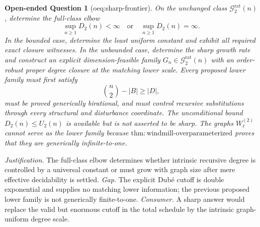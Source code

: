 \documentclass{article}
\newtheorem{openendedquestion}{Open-ended Question}
\begin{document}
\begin{openendedquestion}[oeq:sharp-frontier]\label{oeq:sharp-frontier}
On the unchanged class \(\mathcal G_{2}^{\mathrm{rat}}(n)\), determine the full-class elbow
\[
 \sup_{n\geq1}D_2(n)<\infty\quad\text{or}\quad \sup_{n\geq1}D_2(n)=\infty.
\]
In the bounded case, determine the least uniform constant and exhibit all required exact closure witnesses.  In the unbounded case, determine the sharp growth rate and construct an explicit dimension-feasible family \(G_n\in\mathcal G_{2}^{\mathrm{rat}}(n)\) with an order-robust proper degree closure at the matching lower scale.  Every proposed lower family must first satisfy
\[
 \binom n2-|B|\geq |D|,
\]
must be proved generically birational, and must control recursive substitutions through every structural and disturbance coordinate.  The unconditional bound \(D_2(n)\leq U_2(n)\) is available but is not asserted to be sharp.  The graphs \(W_{\ell}^{(2)}\) cannot serve as the lower family because \(\mathrm{thm:windmill\mbox{-}overparameterized}\) proves that they are generically infinite-to-one.
\end{openendedquestion}
\par\smallskip\noindent \textit{Justification.} The full-class elbow determines whether intrinsic recursive degree is controlled by a universal constant or must grow with graph size after mere effective decidability is settled. \textit{Gap.} The explicit Dubé cutoff is double exponential and supplies no matching lower information; the previous proposed lower family is not generically finite-to-one. \textit{Consumer.} A sharp answer would replace the valid but enormous cutoff in the total schedule by the intrinsic graph-uniform degree scale.
\end{document}
